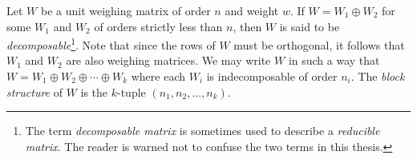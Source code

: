 % 
% 

\begin{definition}
 Let $W$ be a unit weighing matrix of order $n$ and weight $w$. If $W = W_1 \oplus W_2$ for some $W_1$ and $W_2$ of orders strictly less than $n$, then $W$ is said to be {\it decomposable}\footnote{The term {\it decomposable matrix} is sometimes used to describe a {\it reducible matrix}. The reader is warned not to confuse the two terms in this thesis.}. Note that since the rows of $W$ must be orthogonal, it follows that $W_1$ and $W_2$ are also weighing matrices. We may write $W$ in such a way that $W=W_1 \oplus W_2 \oplus \cdots \oplus W_k$ where each $W_i$ is indecomposable of order $n_i$. The {\it block structure} of $W$ is the $k$-tuple $(n_1,n_2, \dots ,n_k).$
\end{definition}

